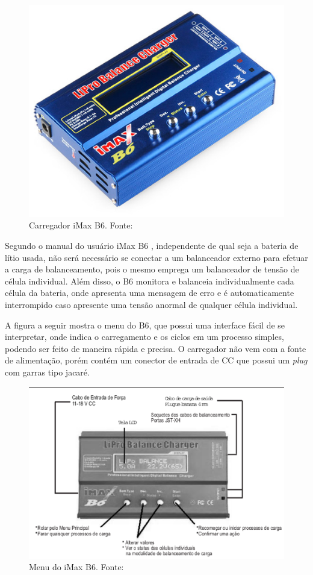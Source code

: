  \begin{figure}[h!]
    \centering
	\includegraphics[keepaspectratio=true,scale=0.4]{figuras/carregador1.eps}
    \caption{Carregador iMax B6. Fonte: \cite{carregador1}}
    \label{fig:carregador1}
\end{figure}


Segundo o manual do usuário iMax B6 \cite{ibmax}, independente de qual seja a bateria de lítio usada, não será necessário se conectar a um balanceador externo para efetuar a carga de balanceamento, pois o mesmo emprega um balanceador de tensão de célula individual. Além disso, o B6 monitora e balanceia individualmente cada célula da bateria, onde apresenta uma mensagem de erro e é automaticamente interrompido caso apresente uma tensão anormal de qualquer célula individual. 

A figura a seguir mostra o menu do B6, que possui uma interface fácil de se interpretar, onde indica o carregamento e os ciclos em um processo simples, podendo ser feito de maneira rápida e precisa. O carregador não vem com a fonte de alimentação, porém contém um conector de entrada de CC que possui um \textit{plug} com garras tipo jacaré.

 \begin{figure}[h!]
    \centering
	\includegraphics[keepaspectratio=true,scale=0.5]{figuras/manual.eps}
    \caption{Menu do iMax B6. Fonte: \cite{ibmax}}
\end{figure}


